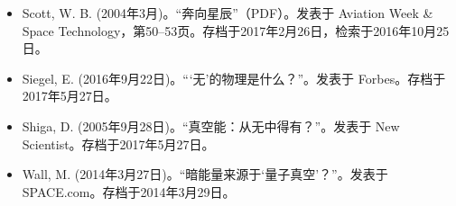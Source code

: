 \begin{itemize}
\item Scott, W. B. (2004年3月)。“奔向星辰”（PDF）。发表于 Aviation Week & Space Technology，第50–53页。存档于2017年2月26日，检索于2016年10月25日。
\item Siegel, E. (2016年9月22日)。“‘无’的物理是什么？”。发表于 Forbes。存档于2017年5月27日。
\item Shiga, D. (2005年9月28日)。“真空能：从无中得有？”。发表于 New Scientist。存档于2017年5月27日。
\item Wall, M. (2014年3月27日)。“暗能量来源于‘量子真空’？”。发表于 SPACE.com。存档于2014年3月29日。
\end{itemize}